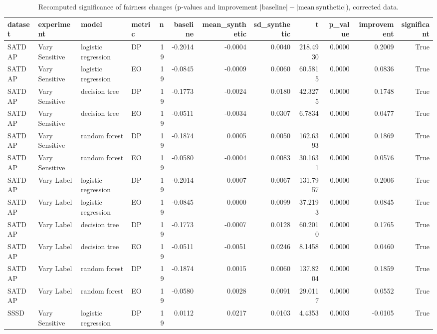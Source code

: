 \begin{table}
\caption{Recomputed significance of fairness changes (p-values and improvement $|\mathrm{baseline}|-|\mathrm{mean\ synthetic}|$), corrected data.}
\label{tab:significance_corrected}
\begin{tabular}{llllrrrrrrrr}
\toprule
dataset & experiment & model & metric & n & baseline & mean_synthetic & sd_synthetic & t & p_value & improvement & significant \\
\midrule
SATDAP & Vary Sensitive & logistic regression & DP & 19 & -0.2014 & -0.0004 & 0.0040 & 218.4930 & 0.0000 & 0.2009 & True \\
SATDAP & Vary Sensitive & logistic regression & EO & 19 & -0.0845 & -0.0009 & 0.0060 & 60.5815 & 0.0000 & 0.0836 & True \\
SATDAP & Vary Sensitive & decision tree & DP & 19 & -0.1773 & -0.0024 & 0.0180 & 42.3275 & 0.0000 & 0.1748 & True \\
SATDAP & Vary Sensitive & decision tree & EO & 19 & -0.0511 & -0.0034 & 0.0307 & 6.7834 & 0.0000 & 0.0477 & True \\
SATDAP & Vary Sensitive & random forest & DP & 19 & -0.1874 & 0.0005 & 0.0050 & 162.6393 & 0.0000 & 0.1869 & True \\
SATDAP & Vary Sensitive & random forest & EO & 19 & -0.0580 & -0.0004 & 0.0083 & 30.1631 & 0.0000 & 0.0576 & True \\
SATDAP & Vary Label & logistic regression & DP & 19 & -0.2014 & 0.0007 & 0.0067 & 131.7957 & 0.0000 & 0.2006 & True \\
SATDAP & Vary Label & logistic regression & EO & 19 & -0.0845 & 0.0000 & 0.0099 & 37.2193 & 0.0000 & 0.0845 & True \\
SATDAP & Vary Label & decision tree & DP & 19 & -0.1773 & -0.0007 & 0.0128 & 60.2010 & 0.0000 & 0.1765 & True \\
SATDAP & Vary Label & decision tree & EO & 19 & -0.0511 & -0.0051 & 0.0246 & 8.1458 & 0.0000 & 0.0460 & True \\
SATDAP & Vary Label & random forest & DP & 19 & -0.1874 & 0.0015 & 0.0060 & 137.8204 & 0.0000 & 0.1859 & True \\
SATDAP & Vary Label & random forest & EO & 19 & -0.0580 & 0.0028 & 0.0091 & 29.0117 & 0.0000 & 0.0552 & True \\
SSSD & Vary Sensitive & logistic regression & DP & 19 & 0.0112 & 0.0217 & 0.0103 & 4.4353 & 0.0003 & -0.0105 & True \\

\end{tabular}
\end{table}
